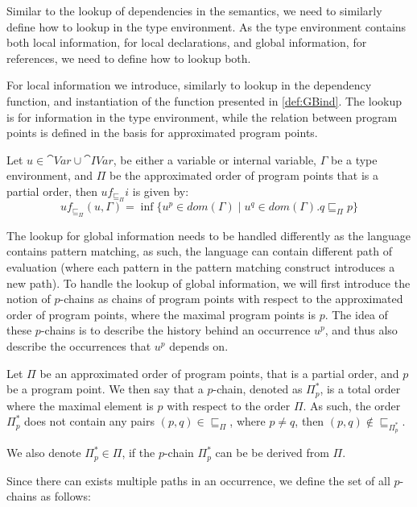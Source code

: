 \documentclass[../../master.tex]{subfiles}
\begin{document}
Similar to the lookup of dependencies in the semantics, we need to similarly define how to lookup in the type environment.
As the type environment contains both local information, for local declarations, and global information, for references, we need to define how to lookup both.

For local information we introduce, similarly to lookup in the dependency function, and instantiation of the function presented in \cref{def:GBind}.
The lookup is for information in the type environment, while the relation between program points is defined in the basis for approximated program points.

\begin{definition}[]\label{def:GBindPi}
	Let $u\in \cat{Var}\cup\cat{IVar}$, be either a variable or internal variable, $\Gamma$ be a type environment, and $\Pi$ be the approximated order of program points that is a partial order, then $uf_{\sqsubseteq_\Pi}i$ is given by:
	$$uf_{\sqsubseteq_\Pi}(u,\Gamma)=\inf\{u^p\in dom(\Gamma)\mid u^q\in dom(\Gamma).q\sqsubseteq_\Pi p\}$$
\end{definition}

The lookup for global information needs to be handled differently as the language contains pattern matching, as such, the language can contain different path of evaluation (where each pattern in the pattern matching construct introduces a new path).
To handle the lookup of global information, we will first introduce the notion of $p$-chains as chains of program points with respect to the approximated order of program points, where the maximal program points is $p$.
The idea of these $p$-chains is to describe the history behind an occurrence $u^p$, and thus also describe the occurrences that $u^p$ depends on.

\begin{definition}[$p$-chains]
	Let $\Pi$ be an approximated order of program points, that is a partial order, and $p$ be a program point.
	We then say that a $p$-chain, denoted as $\Pi_p^{*}$, is a total order where the maximal element is $p$ with respect to the order $\Pi$.
	As such, the order $\Pi_p^{*}$ does not contain any pairs $(p,q)\in\sqsubseteq_\Pi$, where $p\neq q$, then $(p,q)\notin\sqsubseteq_{\Pi_p^{*}}$.
\end{definition}

We also denote $\Pi_p^{*}\in\Pi$, if the $p$-chain $\Pi_p^{*}$ can be be derived from $\Pi$.

Since there can exists multiple paths in an occurrence, we define the set of all $p$-chains as follows:
\end{document}
